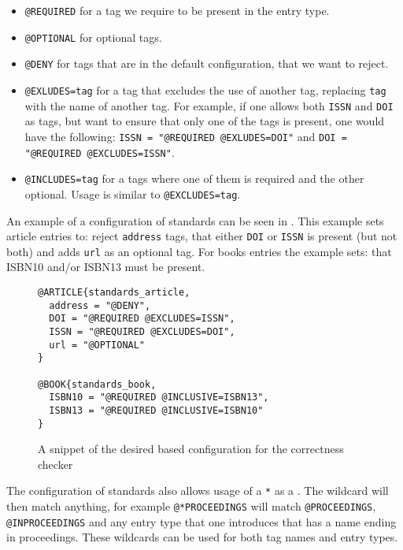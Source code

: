 \begin{itemize}
\item \texttt{@REQUIRED} for a tag we require to be present in the
  entry type.
\item \texttt{@OPTIONAL} for optional tags.
\item \texttt{@DENY} for tags that are in the default configuration,
  that we want to reject.
\item \texttt{@EXLUDES=tag} for a tag that excludes the use of another
  tag, replacing \texttt{tag} with the name of another tag.  For
  example, if one allows both \texttt{ISSN} and \texttt{DOI} as tags,
  but want to ensure that only one of the tags is present, one would
  have the following: \texttt{ISSN = "@REQUIRED @EXLUDES=DOI"} and
  \texttt{DOI = "@REQUIRED @EXCLUDES=ISSN"}.
\item \texttt{@INCLUDES=tag} for a tags where one of them is required
  and the other optional.  Usage is similar to \texttt{@EXCLUDES=tag}.
\end{itemize}

An example of a configuration of standards can be seen in
.  This example sets article
entries to: reject \texttt{address} tags, that either \texttt{DOI} or
\texttt{ISSN} is present (but not both) and adds \texttt{url} as an
optional tag.  For books entries the example sets: that ISBN10 and/or
ISBN13 must be present.

\begin{figure}
  \centering
\begin{verbatim}
@ARTICLE{standards_article,
  address = "@DENY",
  DOI = "@REQUIRED @EXCLUDES=ISSN",
  ISSN = "@REQUIRED @EXCLUDES=DOI",
  url = "@OPTIONAL"
}

@BOOK{standards_book,
  ISBN10 = "@REQUIRED @INCLUSIVE=ISBN13",
  ISBN13 = "@REQUIRED @INCLUSIVE=ISBN10"
}
\end{verbatim}
  \caption{A snippet of the desired {\bibtex} based configuration for
    the correctness checker}
  \label{fig:analyzing_standards_config}
\end{figure}

The configuration of standards also allows usage of a \texttt{*} as a
.  The wildcard will then match anything, for example
\texttt{@*PROCEEDINGS} will match \texttt{@PROCEEDINGS},
\texttt{@INPROCEEDINGS} and any entry type that one introduces that has
a name ending in proceedings.  These wildcards can be used for both
tag names and entry types.

